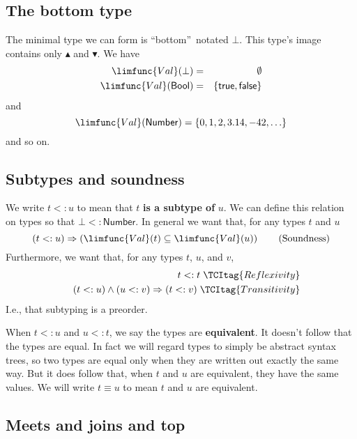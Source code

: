 \documentclass[12pt]{article}
\begin{document}
\subsection{The bottom type}

The minimal type we can form is \textquotedblleft bottom\textquotedblright\
notated $\bot $. This type's image contains only $\blacktriangle $ and $%
\blacktriangledown $. We have 
\begin{eqnarray*}
\limfunc{Val}(\bot ) &=&\emptyset \\
\limfunc{Val}(\mathsf{Bool}) &=&\left\{ \mathsf{true},\mathsf{false}\right\}
\end{eqnarray*}%
and 
\begin{equation*}
\limfunc{Val}(\mathsf{Number})=\left\{ 0,1,2,3.14,-42,\ldots \right\}
\end{equation*}%
and so on.

\subsection{Subtypes and soundness}

We write $t<:u$ to mean that $t$ \textbf{is a subtype of} $u$. We can define
this relation on types so that $\bot <:\mathsf{Number}$. In general we want
that, for any types $t$ and $u$%
\begin{equation}
\left( t<:u\right) \Rightarrow \left( \limfunc{Val}(t)\subseteq \limfunc{Val}%
(u)\right)  \tag{Soundness}
\end{equation}%
Furthermore, we want that, for any types $t$, $u$, and $v$,%
\begin{eqnarray}
&&\left. t<:t\right.  \TCItag{Reflexivity} \\
&&\left. \left( t<:u\right) \wedge \left( u<:v\right) \Rightarrow \left(
t<:v\right) \right.  \TCItag{Transitivity}
\end{eqnarray}%
I.e., that subtyping is a preorder.

When $t<:u$ and $u<:t$, we say the types are \textbf{equivalent}. It doesn't
follow that the types are equal. In fact we will regard types to simply be
abstract syntax trees, so two types are equal only when they are written out
exactly the same way. But it does follow that, when $t$ and $u$ are
equivalent, they have the same values. We will write $t\equiv u$ to mean $t$
and $u$ are equivalent.

\subsection{Meets and joins and top}
\end{document}
